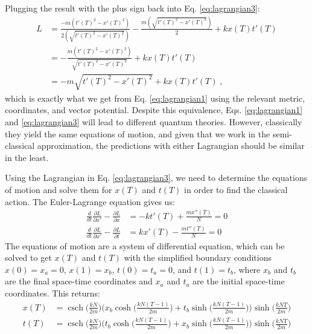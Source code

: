 \documentclass[12pt]{revtex4}
\DeclareMathOperator{\csch}{csch}
\begin{document}
Plugging the result with the plus sign back into Eq. \ref{eq:lagrangian3}:
\begin{align} 
L &= \frac{-m (t'(T)^2 - x'(T)^2)}{2\left(\sqrt{t'(T)^2-x'(T)^2}\right)} -\frac{m \left(\sqrt{t'(T)^2-x'(T)^2}\right)}{2} + k x(T) t'(T) \\
&= -\frac{m (t'(T)^2 - x'(T)^2)}{\sqrt{t'(T)^2-x'(T)^2}} + k x(T) t'(T)\\
&= -m \sqrt{t'(T)^2-x'(T)^2} + k x(T) t'(T) \;,
\end{align}
which is exactly what we get from Eq. \ref{eq:lagrangian1} using the relevant metric, coordinates, and vector potential. Despite this equivalence, Eqs. \ref{eq:lagrangian1} and \ref{eq:lagrangian3} will lead to different quantum theories. However, classically they yield the same equations of motion, and given that we work in the semi-classical approximation, the predictions with either Lagrangian should be similar in the least.

Using the Lagrangian in Eq. \ref{eq:lagrangian3}, we need to determine the equations of motion and solve them for $x(T)$ and $t(T)$ in order to find the classical action. The Euler-Lagrange equation gives us:
\begin{align*}
\frac{d}{dt}\frac{\partial L}{\partial x'}-\frac{\partial L}{\partial x} &= -k t'(T) + \frac{m x''(T)}{N} =0\\
\frac{d}{dt}\frac{\partial L}{\partial x'}-\frac{\partial L}{\partial t} &= k x'(T) - \frac{m t''(T)}{N} =0
\end{align*}
The equations of motion are a system of differential equation, which can be solved to get $x(T)$ and $t(T)$ with the simplified boundary conditions $x(0) = x_a = 0$, $x(1)=x_b$, $t(0) = t_a = 0$, and $t(1)=t_b$, where $x_b$ and $t_b$ are the final space-time coordinates and $x_a$ and $t_a$ are the initial space-time coordinates. This returns:
\begin{align*}
x(T) &= \csch \bigg(\frac{k N}{2 m}\bigg) \Biggr(x_b \cosh\bigg(\frac{k N (T-1)}{2m}\bigg)+ 
t_b \sinh\bigg(\frac{k N (T-1)}{2m}\bigg)\Biggr) \sinh\bigg(\frac{k N T}{2m}\bigg)\\
t(T)&= \csch \bigg(\frac{k N}{2 m}\bigg) \Biggr(t_b \cosh\bigg(\frac{k N (T-1)}{2m}\bigg)+ 
x_b \sinh\bigg(\frac{k N (T-1)}{2m}\bigg)\Biggr) \sinh\bigg(\frac{k N T}{2m}\bigg)
\end{align*} 
\end{document}
